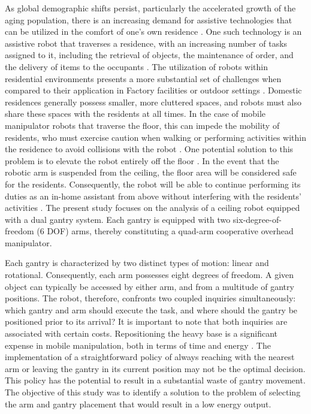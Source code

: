 \documentclass[conference]{IEEEtran}
\begin{document}
As global demographic shifts persist, particularly the accelerated growth of the aging population, 
there is an increasing demand for assistive technologies that can be utilized in 
the comfort of one's own residence \cite{unitednations2024world,who2025clinical}. 
One such technology is an assistive robot that traverses a residence, with an 
increasing number of tasks assigned to it, including the retrieval of objects, 
the maintenance of order, and the delivery of items to the occupants \cite{IFR2025,Lisondra2025}. 
The utilization of robots within residential environments presents a more substantial 
set of challenges when compared to their application in Factory facilities or outdoor settings \cite{kemp2007challenges}. 
Domestic residences generally possess smaller, more cluttered spaces, 
and robots must also share these spaces with the residents at all times. 
In the case of mobile manipulator robots that traverse the floor, this can impede 
the mobility of residents, who must exercise caution when walking or performing 
activities within the residence to avoid collisions with the robot \cite{sisbot2007human}. 
One potential solution to this problem is to elevate the robot entirely off the floor \cite{toyama2002development}. 
In the event that the robotic arm is suspended from the ceiling, 
the floor area will be considered safe for the residents. 
Consequently, the robot will be able to continue performing its duties 
as an in-home assistant from above without interfering with the residents' activities \cite{Jayathilaka2025}. 
The present study focuses on the analysis of a ceiling robot equipped with a dual gantry system. 
Each gantry is equipped with two six-degree-of-freedom (6 DOF) arms, 
thereby constituting a quad-arm cooperative overhead manipulator.


Each gantry is characterized by two distinct types of motion: linear and rotational. 
Consequently, each arm possesses eight degrees of freedom. 
A given object can typically be accessed by either arm, and from a multitude of 
gantry positions. 
The robot, therefore, confronts two coupled inquiries simultaneously: 
which gantry and arm should execute the task, and where should the gantry 
be positioned prior to its arrival? It is important to note that both 
inquiries are associated with certain costs. 
Repositioning the heavy base is a significant expense in mobile manipulation, 
both in terms of time and energy \cite{MoMaPos2024,BaSeNet2024,EnergySLR2024}. 
The implementation of a straightforward policy of always reaching with 
the nearest arm or leaving the gantry in its current position may not be the optimal decision. 
This policy has the potential to result in a substantial waste of gantry movement. 
The objective of this study was to identify a solution to the problem of 
selecting the arm and gantry placement that would result in a low energy output.
\end{document}
